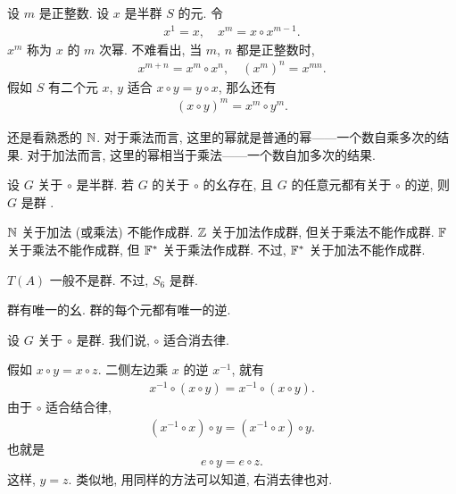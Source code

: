 \begin{definition}
    设 $m$ 是正整数. 设 $x$ 是半群 $S$ 的元. 令
    \begin{align*}
        x^{1} = x, \quad x^{m} = x \circ x^{m-1}.
    \end{align*}
    $x^{m}$ 称为 $x$ 的 $m$ 次幂. 不难看出, 当 $m$, $n$ 都是正整数时,
    \begin{align*}
        x^{m+n} = x^m \circ x^n, \quad (x^m)^n = x^{mn}.
    \end{align*}
    假如 $S$ 有二个元 $x$, $y$ 适合 $x \circ y = y \circ x$, 那么还有
    \begin{align*}
        (x \circ y)^m = x^m \circ y^m.
    \end{align*}
\end{definition}

\begin{example}
    还是看熟悉的 $\mathbb{N}$. 对于乘法而言, 这里的幂就是普通的幂——一个数自乘多次的结果. 对于加法而言, 这里的幂相当于乘法——一个数自加多次的结果.
\end{example}

\begin{definition}
    设 $G$ 关于 $\circ$ 是半群. 若 $G$ 的关于 $\circ$ 的幺存在, 且 $G$ 的任意元都有关于 $\circ$ 的逆, 则 $G$ 是群 .
\end{definition}

\begin{example}
    $\mathbb{N}$ 关于加法 (或乘法) 不能作成群. $\mathbb{Z}$ 关于加法作成群, 但关于乘法不能作成群. $\mathbb{F}$ 关于乘法不能作成群, 但 $\mathbb{F}^{\ast}$ 关于乘法作成群. 不过, $\mathbb{F}^{\ast}$ 关于加法不能作成群.
\end{example}

\begin{example}
    $T(A)$ 一般不是群. 不过, $S_6$ 是群.
\end{example}

\begin{remark}
    群有唯一的幺. 群的每个元都有唯一的逆.
\end{remark}

\begin{remark}
    设 $G$ 关于 $\circ$ 是群. 我们说, $\circ$ 适合消去律.

    假如 $x \circ y = x \circ z$. 二侧左边乘 $x$ 的逆 $x^{-1}$, 就有
    \begin{align*}
        x^{-1} \circ (x \circ y) = x^{-1} \circ (x \circ y).
    \end{align*}
    由于 $\circ$ 适合结合律,
    \begin{align*}
        (x^{-1} \circ x) \circ y = (x^{-1} \circ x) \circ y.
    \end{align*}
    也就是
    \begin{align*}
        e \circ y = e \circ z.
    \end{align*}
    这样, $y = z$. 类似地, 用同样的方法可以知道, 右消去律也对.
\end{remark}

